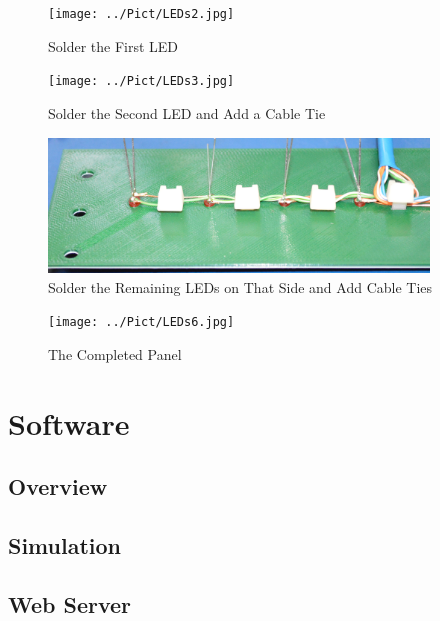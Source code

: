 \documentclass[10pt, openany]{book}
\begin{document}
\begin{figure}[ht!]
  \centering
  \texttt{[image: ../Pict/LEDs2.jpg]}
  \caption{Solder the First LED}
  \label{fig:LED2}
\end{figure}

\begin{figure}[ht!]
  \centering
  \texttt{[image: ../Pict/LEDs3.jpg]}
  \caption{Solder the Second LED and Add a Cable Tie}
  \label{fig:LED3}
\end{figure}

\begin{figure}[ht!]
  \centering
  \includegraphics[width=0.9\textwidth]{../Pict/LEDs4.jpg}
  \caption{Solder the Remaining LEDs on That Side and Add Cable Ties}
  \label{fig:LED4}
\end{figure}

\begin{figure}[ht!]
  \centering
  \texttt{[image: ../Pict/LEDs6.jpg]}
  \caption{The Completed Panel}
  \label{fig:LED6}
\end{figure}

\clearpage
\chapter{Software}
\section{Overview}

\section{Simulation}

\section{Web Server}
\end{document}
